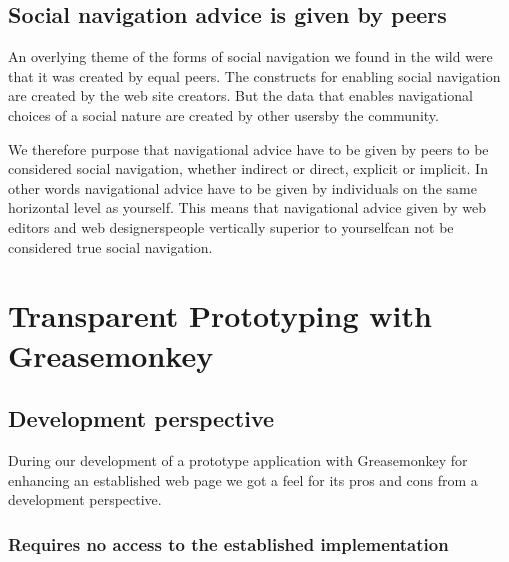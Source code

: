 \subsection{Social navigation advice is given by peers}

An overlying theme of the forms of social navigation we found in the wild were
that it was created by equal peers. The constructs for enabling social
navigation are created by the web site creators. But the data that
enables navigational choices of a social nature are created by other
users\dash{}by the community.

We therefore purpose that navigational advice have to
be given by peers to be considered social navigation,
whether indirect or direct, explicit or implicit.
In other words
navigational advice have to be given by individuals on the same horizontal
level as yourself. This means that navigational advice given by web editors
and web designers\dash{}people vertically superior to yourself\dash{}can not
be considered true social navigation.

%



\section{Transparent Prototyping with Greasemonkey}

\subsection{Development perspective}

During our development of a prototype application with Greasemonkey for
enhancing an established web page we got a feel for its pros and cons from a
development perspective.

\subsubsection{Requires no access to the established implementation}

